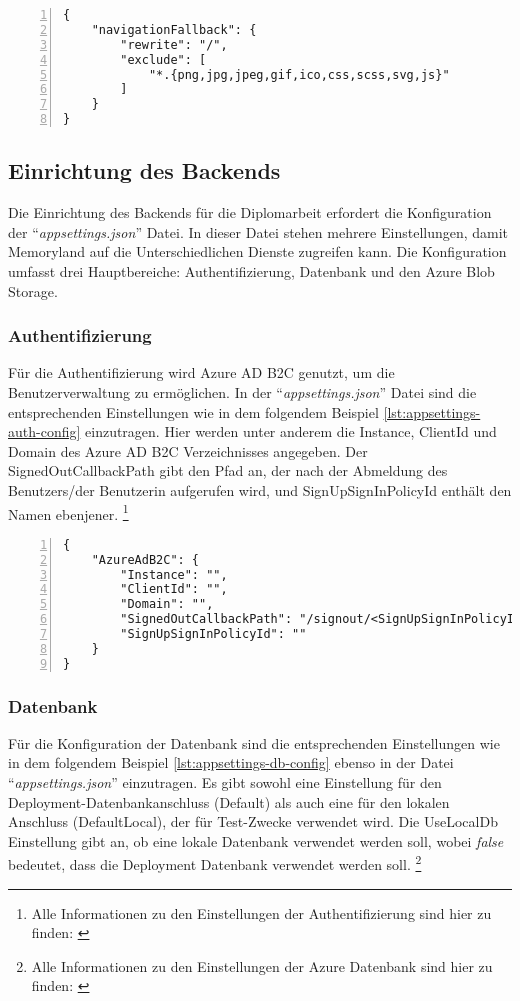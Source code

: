 \begin{lstlisting}[numbers=left,caption={staticwebapp.config.json},label={lst:staticwebapp-config}]
{
    "navigationFallback": {
        "rewrite": "/",
        "exclude": [
            "*.{png,jpg,jpeg,gif,ico,css,scss,svg,js}"
        ]
    }
}
\end{lstlisting}


\subsection{Einrichtung des Backends}

Die Einrichtung des Backends für die Diplomarbeit erfordert die Konfiguration 
der ``\emph{appsettings.json}'' Datei. In dieser Datei stehen mehrere Einstellungen,
damit Memoryland auf die Unterschiedlichen Dienste zugreifen kann. Die Konfiguration 
umfasst drei Hauptbereiche: Authentifizierung, Datenbank und den Azure Blob Storage.

\subsubsection{Authentifizierung}

Für die Authentifizierung wird Azure AD B2C genutzt, um die Benutzerverwaltung zu ermöglichen. 
In der ``\emph{appsettings.json}'' Datei sind die entsprechenden Einstellungen wie in dem folgendem
Beispiel \ref{lst:appsettings-auth-config} einzutragen. Hier werden unter anderem die Instance, ClientId und Domain des 
Azure AD B2C Verzeichnisses angegeben. Der SignedOutCallbackPath gibt den Pfad an, der nach 
der Abmeldung des Benutzers/der Benutzerin aufgerufen wird, und SignUpSignInPolicyId enthält 
den Namen ebenjener. \footnote{Alle Informationen zu den Einstellungen der Authentifizierung sind hier zu finden: \cite{MicrosoftCorporationk}}

\begin{lstlisting}[numbers=left,caption={appsettings.json},label={lst:appsettings-auth-config}]
{
    "AzureAdB2C": {
        "Instance": "",
        "ClientId": "",
        "Domain": "",
        "SignedOutCallbackPath": "/signout/<SignUpSignInPolicyId>",
        "SignUpSignInPolicyId": ""
    }
}
\end{lstlisting}

\subsubsection{Datenbank}

Für die Konfiguration der Datenbank sind die entsprechenden Einstellungen wie in dem folgendem
Beispiel \ref{lst:appsettings-db-config} ebenso in der Datei ``\emph{appsettings.json}'' 
einzutragen. Es gibt sowohl eine Einstellung für den Deployment-Datenbankanschluss (Default) 
als auch eine für den lokalen Anschluss (DefaultLocal), der für Test-Zwecke verwendet wird. 
Die UseLocalDb Einstellung gibt an, ob eine lokale Datenbank verwendet werden soll, wobei
\emph{false} bedeutet, dass die Deployment Datenbank verwendet werden soll.
\footnote{Alle Informationen zu den Einstellungen der Azure Datenbank sind hier zu finden: \cite{MicrosoftCorporationl}}


